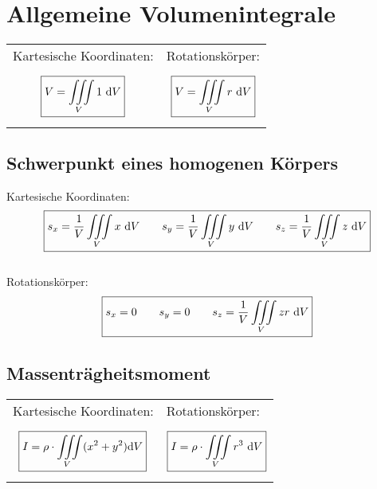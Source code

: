 \section{Allgemeine Volumenintegrale}
\begin{tabular}{p{.5\linewidth}p{.5\linewidth}}
	Kartesische Koordinaten:	&	Rotationskörper:\\
	\[\boxed{
		V = \iiint\limits_{V} 1\ \mathrm{d} V
	}\]
	&
	\[\boxed{
		V = \iiint\limits_{V} r\ \mathrm{d} V
	}\]
\end{tabular}


\subsection{Schwerpunkt eines homogenen Körpers}
Kartesische Koordinaten:
\[\boxed{
	s_x=\frac{1}{V}\iiint\limits_{V} x \ \mathrm{d} V \qquad
	s_y=\frac{1}{V}\iiint\limits_{V} y \ \mathrm{d} V \qquad
	s_z=\frac{1}{V}\iiint\limits_{V} z \ \mathrm{d} V
}\]
\\
Rotationskörper:
\[\boxed{
	s_x = 0 \qquad
	s_y = 0 \qquad
	s_z=\frac{1}{V}\iiint\limits_{V} zr \ \mathrm{d} V
}\]

\subsection{Massenträgheitsmoment}
\begin{tabular}{p{.5\linewidth}p{.5\linewidth}}
	Kartesische Koordinaten:	&	Rotationskörper: \\
	\[\boxed{
		I = \rho \cdot \iiint\limits_V (x^2+y^2) \mathrm{d} V
	}\]	
	&	
	\[\boxed{
		I = \rho \cdot \iiint\limits_V r^3 \ \mathrm{d} V
	}\]
\end{tabular}